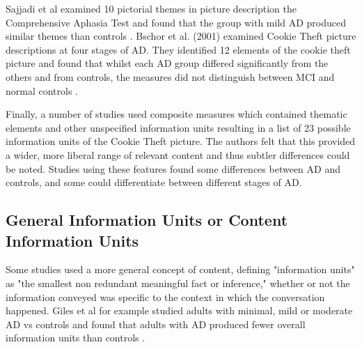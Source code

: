 \documentclass[10pt, letterpaper, twoside, openany]{book}
\begin{document}
Sajjadi et al examined 10 pictorial themes in picture description the Comprehensive Aphasia Test and found that the group with mild AD produced similar themes than controls \cite{Sajjadi2012}. Bschor et al. (2001) examined Cookie Theft picture descriptions at four stages of AD. They identified 12 elements of the cookie theft picture and found that whilst each AD group differed significantly from the others and from controls, the measures did not distinguish between MCI and normal controls \cite{Bschor2001}.
\par
Finally, a number of studies used composite measures which contained thematic elements and other unspecified information units resulting in a list of 23 possible information units of the Cookie Theft picture. The authors felt that this provided a wider, more liberal range of relevant content and thus subtler differences could be noted. Studies using these features found some differences between AD and controls, and some could differentiate between different stages of AD.
\subsection{General Information Units or Content Information Units}
Some studies used a more general concept of content, defining "information units" as "the smallest non redundant meaningful fact or inference," whether or not the information conveyed was specific to the context in which the conversation happened. Giles et al for example studied adults with minimal, mild or moderate AD vs controls and found that adults with AD produced fewer overall information units than controls \cite{Giles1996}.
\end{document}
